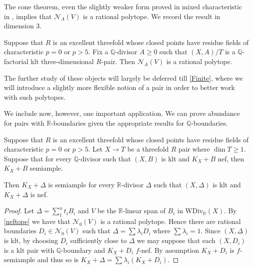 The cone theorem, even the slightly weaker form proved in mixed characteristic in \cite{bhatt2020}, implies that $\mathcal{N}_{A}(V)$ is a rational polytope. We record the result in dimension $3$.

\begin{lemma}\label{neftope} \cite[Proposition 9.31]{bhatt2020}
	Suppose that $R$ is an excellent threefold whose closed points have residue fields of characteristic $p=0$ or $p > 5$.
	Fix a $\mathbb{Q}$-divisor $A \geq 0$ such that $(X,A)/T$ is a $\mathbb{Q}$-factorial klt three-dimensional $R$-pair.
	Then $\mathcal{N}_{A}(V)$ is a rational polytope.
\end{lemma}

The further study of these objects will largely be deferred till \autoref{Finite}, where we will introduce a slightly more flexible notion of a pair in order to better work with such polytopes.

We include now, however, one important application. We can prove abundance for pairs with $\mathbb{R}$-boundaries given the appropriate results for $\mathbb{Q}$-boundaries.

\begin{proposition}\label{QtoR}
	Suppose that $R$ is an excellent threefold whose closed points have residue fields of characteristic $p=0$ or $p > 5$.
	Let $X \to T$ be a threefold $R$ pair where $\dim T \geq 1$. Suppose that for every $\mathbb{Q}$-divisor such that $(X,B)$ is klt and $K_{X}+B$ nef, then $K_{X}+B$ semiample.
	
	Then $K_X+\Delta$ is semiample for every $\mathbb{R}$-divisor $\Delta$ such that $(X,\Delta)$ is klt and $K_X+\Delta$ is nef.
\end{proposition}
\begin{proof}
	Let $\Delta= \sum_{1}^{n} t_{i}B_{i}$ and $V$ be the $\mathbb{R}$-linear span of $B_i$ in $\text{WDiv}_\mathbb{R}(X)$. By \autoref{neftope} we have that $\mathcal{N}_{0}(V)$ is a rational polytope. Hence there are rational boundaries $D_{i} \in \mathcal{N}_{0}(V)$ such that $\Delta=\sum \lambda_{i} D_{i}$ where $\sum \lambda_{i} =1$. Since $(X,\Delta)$ is klt, by choosing $D_{i}$ sufficiently close to $\Delta$ we may suppose that each $(X,D_{i})$ is a klt pair with $\mathbb{Q}$-boundary and $K_X+D_i$ $f$-nef. 
	By assumption $K_{X}+D_{i}$ is $f$-semiample and thus so is $K_{X}+\Delta=\sum \lambda_{i} (K_{X}+D_{i})$.
\end{proof}

%
%
%



